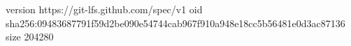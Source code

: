 version https://git-lfs.github.com/spec/v1
oid sha256:09483687791f59d2be090e54744cab967f910a948e18cc5b56481e0d3ac87136
size 204280
